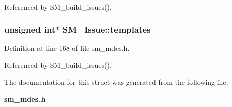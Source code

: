Referenced by SM\_\-build\_\-issues().
\subsubsection{\setlength{\rightskip}{0pt plus 5cm}unsigned int$\ast$ \bf{SM\_\-Issue::templates}}\label{structSM__Issue_a7c7da141e6827cba217afcec7b57c68}




Definition at line 168 of file sm\_\-mdes.h.

Referenced by SM\_\-build\_\-issues().

The documentation for this struct was generated from the following file:\begin{CompactItemize}
\item 
\bf{sm\_\-mdes.h}\end{CompactItemize}
